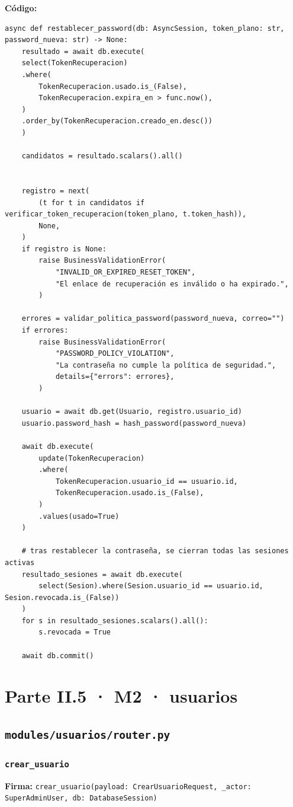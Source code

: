 \documentclass[11pt,a4paper]{article}
\begin{document}
\textbf{Código:}
\begin{lstlisting}
async def restablecer_password(db: AsyncSession, token_plano: str, password_nueva: str) -> None:
    resultado = await db.execute(
    select(TokenRecuperacion)
    .where(
        TokenRecuperacion.usado.is_(False),
        TokenRecuperacion.expira_en > func.now(),
    )
    .order_by(TokenRecuperacion.creado_en.desc())
    )

    candidatos = resultado.scalars().all()


    registro = next(
        (t for t in candidatos if verificar_token_recuperacion(token_plano, t.token_hash)),
        None,
    )
    if registro is None:
        raise BusinessValidationError(
            "INVALID_OR_EXPIRED_RESET_TOKEN",
            "El enlace de recuperación es inválido o ha expirado.",
        )

    errores = validar_politica_password(password_nueva, correo="")
    if errores:
        raise BusinessValidationError(
            "PASSWORD_POLICY_VIOLATION",
            "La contraseña no cumple la política de seguridad.",
            details={"errors": errores},
        )

    usuario = await db.get(Usuario, registro.usuario_id)
    usuario.password_hash = hash_password(password_nueva)

    await db.execute(
        update(TokenRecuperacion)
        .where(
            TokenRecuperacion.usuario_id == usuario.id,
            TokenRecuperacion.usado.is_(False),
        )
        .values(usado=True)
    )

    # tras restablecer la contraseña, se cierran todas las sesiones activas
    resultado_sesiones = await db.execute(
        select(Sesion).where(Sesion.usuario_id == usuario.id, Sesion.revocada.is_(False))
    )
    for s in resultado_sesiones.scalars().all():
        s.revocada = True

    await db.commit()
\end{lstlisting}

\section{Parte II.5 · M2 · usuarios}
\subsection{\texttt{modules/usuarios/router.py}}

\subsubsection*{\texttt{crear\_usuario}}
\textbf{Firma:} \texttt{crear\_usuario(payload: CrearUsuarioRequest, \_actor: SuperAdminUser, db: DatabaseSession)}
\end{document}
